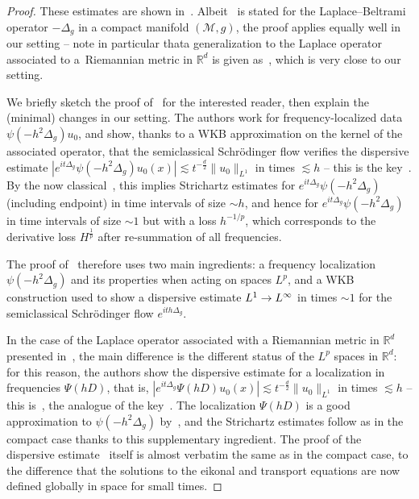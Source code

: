 \documentclass[AHL,Unicode,longabstracts,published]{cedram}
\newcommand*\R{\mathbb{R}}
\newcommand{\clM}{\mathcal{M}}
\renewcommand*{\to}{\mathchoice{\longrightarrow}{\rightarrow}{\rightarrow}{\rightarrow}}
\begin{document}
\begin{proof}
These estimates are shown in~\cite[Theorem~1]{BuGeTz04}. Albeit~\cite[Theorem~1]{BuGeTz04} is stated for the Laplace--Beltrami operator $-\Delta_g$ in a compact manifold $(\clM, g)$, the proof applies equally well in our setting -- note in particular that\linebreak a generalization to the Laplace operator associated to a~Riemannian metric in $\R^d$ is given as~\cite[Appendix~A.1]{BuGeTz04}, which is very close to our setting.

We briefly sketch the proof of~\cite[Theorem~1]{BuGeTz04} for the interested reader, then explain the (minimal) changes in our setting. The authors work for frequency-localized data $\psi(-h^2 \Delta_g) u_0$, and show, thanks to a WKB approximation on the kernel of the associated operator, that the semiclassical Schr{\"o}dinger flow verifies the dispersive estimate $|e^{it\Delta_g}\psi(-h^2 \Delta_g) u_0 (x)| \lesssim t^{-\frac d2}\| u_0 \|_{L^1}$ in times $\lesssim h$ -- this is the key~\cite[Lemma~2.5]{BuGeTz04}. By the now classical~\cite{KeTa98}, this implies Strichartz estimates for $e^{it\Delta_g}\psi(-h^2 \Delta_g)$ (including endpoint) in time intervals of size $\sim h$, and hence for $e^{it\Delta_g}\psi(-h^2 \Delta_g)$ in time intervals of size $\sim 1$ but with a loss $h^{-1/p}$, which corresponds to the derivative loss $H^{\frac 1p}$ after re-summation of all frequencies.

The proof of~\cite[Theorem~1]{BuGeTz04} therefore uses two main ingredients: a frequency localization $\psi(-h^2 \Delta_g)$ and its properties when acting on spaces $L^p$, and a WKB construction used to show a dispersive estimate $L^1\to L^\infty$ in times $\sim 1$ for the semiclassical Schr{\"o}dinger flow $e^{ith\Delta_g}$.

In the case of the Laplace operator associated with a Riemannian metric in $\R^d$ presented in~\cite[Appendix~A.1]{BuGeTz04}, the main difference is the different status of the $L^p$ spaces in $\R^d$: for this reason, the authors show the dispersive estimate for a localization in frequencies $\Psi(hD)$, that is, $|e^{it\Delta_g}\Psi(hD) u_0 (x)| \lesssim t^{-\frac d2}\| u_0 \|_{L^1}$ in times $\lesssim h$ -- this is~\cite[Lemma~A.3]{BuGeTz04}, the analogue of the key~\cite[Lemma~2.5]{BuGeTz04}. The localization $\Psi(hD)$ is a good approximation to $\psi(-h^2 \Delta_g)$ by~\cite[Proposition~A.1, Corollary~A.2]{BuGeTz04}, and the Strichartz estimates follow as in the compact case thanks to this supplementary ingredient. The proof of the dispersive estimate~\cite[Lemma~A.3]{BuGeTz04} itself is almost verbatim the same as in the compact case, to the difference that the solutions to the eikonal and transport equations are now defined globally in space for small times.


\end{proof}
\end{document}
